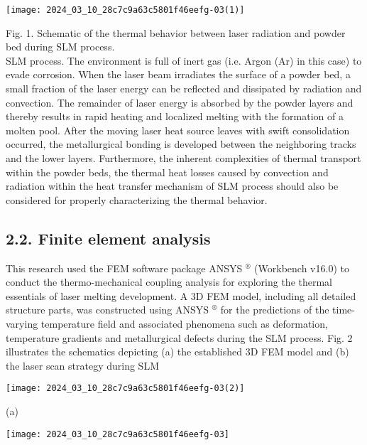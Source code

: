 \documentclass[10pt]{article}
\begin{document}
\begin{center}
\texttt{[image: 2024\_03\_10\_28c7c9a63c5801f46eefg-03(1)]}
\end{center}

Fig. 1. Schematic of the thermal behavior between laser radiation and powder bed during SLM process.\\
SLM process. The environment is full of inert gas (i.e. Argon (Ar) in this case) to evade corrosion. When the laser beam irradiates the surface of a powder bed, a small fraction of the laser energy can be reflected and dissipated by radiation and convection. The remainder of laser energy is absorbed by the powder layers and thereby results in rapid heating and localized melting with the formation of a molten pool. After the moving laser heat source leaves with swift consolidation occurred, the metallurgical bonding is developed between the neighboring tracks and the lower layers. Furthermore, the inherent complexities of thermal transport within the powder beds, the thermal heat losses caused by convection and radiation within the heat transfer mechanism of SLM process should also be considered for properly characterizing the thermal behavior.

\subsection*{2.2. Finite element analysis}
This research used the FEM software package ANSYS ${ }^{\circledR}$ (Workbench v16.0) to conduct the thermo-mechanical coupling analysis for exploring the thermal essentials of laser melting development. A 3D FEM model, including all detailed structure parts, was constructed using ANSYS ${ }^{\circledR}$ for the predictions of the time-varying temperature field and associated phenomena such as deformation, temperature gradients and metallurgical defects during the SLM process. Fig. 2 illustrates the schematics depicting (a) the established 3D FEM model and (b) the laser scan strategy during SLM

\begin{center}
\texttt{[image: 2024\_03\_10\_28c7c9a63c5801f46eefg-03(2)]}
\end{center}

(a)

\begin{center}
\texttt{[image: 2024\_03\_10\_28c7c9a63c5801f46eefg-03]}
\end{center}
\end{document}
